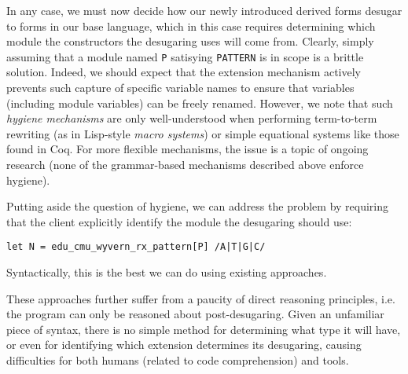 In any case, we must now decide how our newly introduced derived forms desugar to forms in our base language, which in this case requires determining which module the constructors the desugaring uses will come from. Clearly, simply assuming that a module named \lstinline{P} satisying \lstinline{PATTERN} is in scope is a brittle solution. Indeed, we should expect that the extension mechanism actively prevents such capture of specific variable names to ensure that variables (including module variables) can be freely renamed. However, we note that such \emph{hygiene mechanisms} are only well-understood when performing term-to-term rewriting (as in Lisp-style \emph{macro systems}) or simple equational systems like those found in Coq. For more flexible mechanisms, the issue is a topic of ongoing research (none of the grammar-based mechanisms described above enforce hygiene).

Putting aside the question of hygiene, we can address the problem by requiring that the client explicitly identify the module the desugaring should use:
\begin{lstlisting}[numbers=none]
let N = edu_cmu_wyvern_rx_pattern[P] /A|T|G|C/
\end{lstlisting}
Syntactically, this is the best we can do using existing approaches.  

These approaches further suffer from a paucity of direct reasoning principles, i.e. the program can only be reasoned about post-desugaring. Given an unfamiliar piece of syntax, there is no simple method for determining what type it will have, or even for identifying which extension determines its desugaring, causing difficulties for both humans (related to code comprehension) and tools. 


